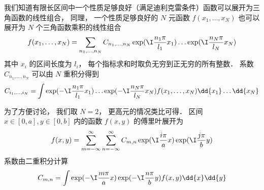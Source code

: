 

我们知道有限长区间中一个性质足够良好（满足迪利克雷条件）函数可以展开为三角函数的线性组合， 同理， 一个性质足够良好的 $N$ 元函数 $f(x_1, \dots, x_N)$ 也可以展开为 $N$ 个三角函数乘积的线性组合
\begin{equation}
f(x_1, \dots, x_N) = \sum_{n_1,\dots, n_N} C_{n_1,\dots, n_N} \exp(\I \frac{n_1\pi}{l_1} x_1) \dots \exp(\I \frac{n_N \pi}{l_N} x_N)
\end{equation}
其中 $x_i$ 的区间长度为 $l_i$， 每个指标求和时取负无穷到正无穷的所有整数． 系数 $C_{n_1,\dots, n_N}$ 可以由 $N$ 重积分得到
\begin{equation}
C_{i_1,\dots, i_N} = \int \exp(-\I \frac{n_1 \pi}{l_1} x_1) \dots \exp(-\I \frac{n_N \pi}{l_N} x_N) f(x_1, \dots, x_N) \dd{x_1}\dots\dd{x_N}
\end{equation}

为了方便讨论， 我们取 $N = 2$， 更高元的情况类比可得． 区间 $x\in [0, a], y\in [0, b]$ 内的函数 $f(x, y)$ 的傅里叶展开为
\begin{equation}
f(x, y) = \sum_{m = -\infty}^\infty \sum_{n = -\infty}^\infty C_{m, n} \exp(\I \frac{i \pi}{a} x) \exp(\I \frac{j \pi}{b} y)
\end{equation}
系数由二重积分计算
\begin{equation}
C_{m, n} = \int \exp(-\I \frac{m \pi}{a} x) \exp(-\I \frac{n \pi}{b} y) f(x, y) \dd{x} \dd{y}
\end{equation}
